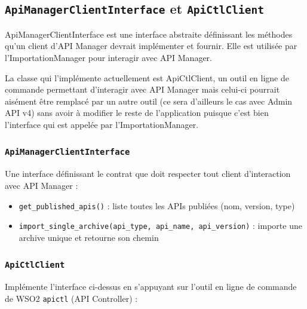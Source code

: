 
\subsection{\texttt{ApiManagerClientInterface} et \texttt{ApiCtlClient}}
ApiManagerClientInterface est une interface abstraite définissant les méthodes qu'un client d'API Manager devrait implémenter et fournir. Elle est utilisée par l'ImportationManager pour interagir avec API Manager.

La classe qui l'implémente actuellement est ApiCtlClient, un outil en ligne de commande permettant d'interagir avec API Manager mais celui-ci pourrait aisément être remplacé par un autre outil (ce sera d'ailleurs le cas avec Admin API v4) sans avoir à modifier le reste de l'application puisque c'est bien l'interface qui est appelée par l'ImportationManager.

\subsubsection{\texttt{ApiManagerClientInterface}}

Une interface définissant le contrat que doit respecter tout client d'interaction avec API Manager :

\begin{itemize}
    \item[$\bullet$] \texttt{get\_published\_apis()} : liste toutes les APIs publiées (nom, version, type)
    \item[$\bullet$] \texttt{import\_single\_archive(api\_type, api\_name, api\_version)} : importe une archive unique et retourne son chemin
\end{itemize}

\subsubsection{\texttt{ApiCtlClient}}

Implémente l'interface ci-dessus en s'appuyant sur l'outil en ligne de commande de WSO2 \texttt{apictl} (API Controller) :

